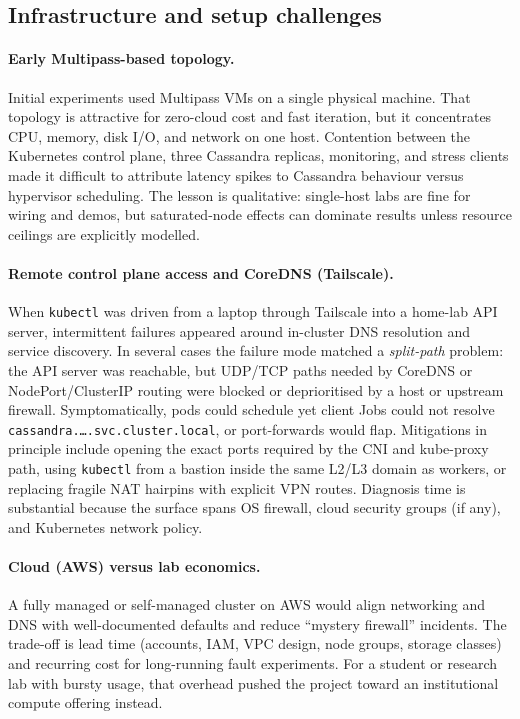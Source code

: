\documentclass[11pt,a4paper]{article}
\begin{document}
\subsection{Infrastructure and setup challenges}
\label{subsec:challenges-infra}

\paragraph{Early Multipass-based topology.}
Initial experiments used Multipass VMs on a single physical machine. That topology is attractive for zero-cloud cost and fast iteration, but it concentrates CPU, memory, disk I/O, and network on one host. Contention between the Kubernetes control plane, three Cassandra replicas, monitoring, and stress clients made it difficult to attribute latency spikes to Cassandra behaviour versus hypervisor scheduling. The lesson is qualitative: single-host labs are fine for wiring and demos, but saturated-node effects can dominate results unless resource ceilings are explicitly modelled.

\paragraph{Remote control plane access and CoreDNS (Tailscale).}
When \texttt{kubectl} was driven from a laptop through Tailscale into a home-lab API server, intermittent failures appeared around in-cluster DNS resolution and service discovery. In several cases the failure mode matched a \emph{split-path} problem: the API server was reachable, but UDP/TCP paths needed by CoreDNS or NodePort/ClusterIP routing were blocked or deprioritised by a host or upstream firewall. Symptomatically, pods could schedule yet client Jobs could not resolve \texttt{cassandra.\dots.svc.cluster.local}, or port-forwards would flap. Mitigations in principle include opening the exact ports required by the CNI and kube-proxy path, using \texttt{kubectl} from a bastion inside the same L2/L3 domain as workers, or replacing fragile NAT hairpins with explicit VPN routes. Diagnosis time is substantial because the surface spans OS firewall, cloud security groups (if any), and Kubernetes network policy.

\paragraph{Cloud (AWS) versus lab economics.}
A fully managed or self-managed cluster on AWS would align networking and DNS with well-documented defaults and reduce ``mystery firewall'' incidents. The trade-off is lead time (accounts, IAM, VPC design, node groups, storage classes) and recurring cost for long-running fault experiments. For a student or research lab with bursty usage, that overhead pushed the project toward an institutional compute offering instead.
\end{document}
